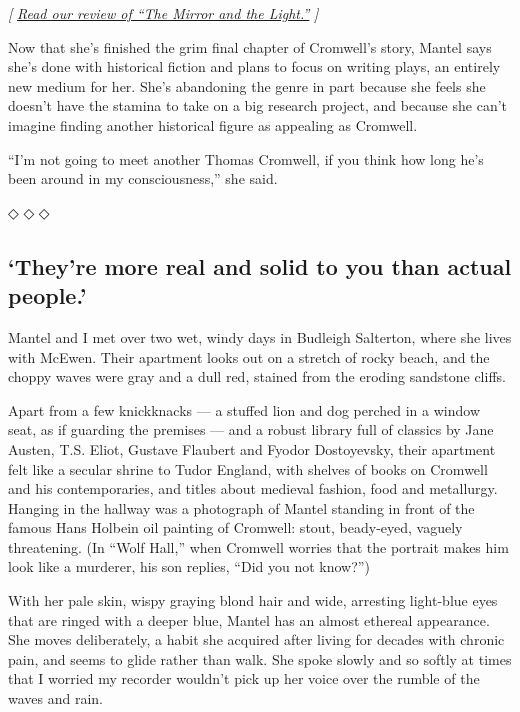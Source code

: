 \emph{{[}}
\href{https://www.nytimes.com/2020/03/03/books/review-mirror-light-hilary-mantel.html}{\emph{Read
our review of ``The Mirror and the Light.''}} \emph{{]}}

Now that she's finished the grim final chapter of Cromwell's story,
Mantel says she's done with historical fiction and plans to focus on
writing plays, an entirely new medium for her. She's abandoning the
genre in part because she feels she doesn't have the stamina to take on
a big research project, and because she can't imagine finding another
historical figure as appealing as Cromwell.

``I'm not going to meet another Thomas Cromwell, if you think how long
he's been around in my consciousness,'' she said.

◇ ◇ ◇

\hypertarget{theyre-more-real-and-solid-to-you-than-actual-people}{%
\subsection{`They're more real and solid to you than actual
people.'}\label{theyre-more-real-and-solid-to-you-than-actual-people}}

Mantel and I met over two wet, windy days in Budleigh Salterton, where
she lives with McEwen. Their apartment looks out on a stretch of rocky
beach, and the choppy waves were gray and a dull red, stained from the
eroding sandstone cliffs.

Apart from a few knickknacks --- a stuffed lion and dog perched in a
window seat, as if guarding the premises --- and a robust library full
of classics by Jane Austen, T.S. Eliot, Gustave Flaubert and Fyodor
Dostoyevsky, their apartment felt like a secular shrine to Tudor
England, with shelves of books on Cromwell and his contemporaries, and
titles about medieval fashion, food and metallurgy. Hanging in the
hallway was a photograph of Mantel standing in front of the famous Hans
Holbein oil painting of Cromwell: stout, beady-eyed, vaguely
threatening. (In ``Wolf Hall,'' when Cromwell worries that the portrait
makes him look like a murderer, his son replies, ``Did you not know?'')

With her pale skin, wispy graying blond hair and wide, arresting
light-blue eyes that are ringed with a deeper blue, Mantel has an almost
ethereal appearance. She moves deliberately, a habit she acquired after
living for decades with chronic pain, and seems to glide rather than
walk. She spoke slowly and so softly at times that I worried my recorder
wouldn't pick up her voice over the rumble of the waves and rain.

